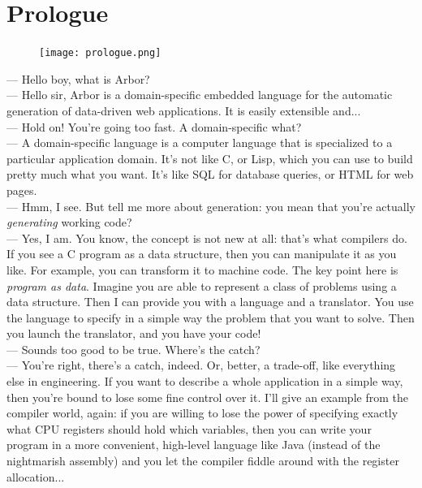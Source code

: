 \documentclass[12pt]{article} %
\newcommand{\ddwa}{data-driven web application}
\newcommand{\dsel}{domain-specific embedded language}
\newcommand{\dsl}{domain-specific language}
\newcommand{\A}{Arbor}
\begin{document}

\tableofcontents %

\newpage %

\section{Prologue}
\begin{figure}\texttt{[image: prologue.png]}\end{figure}
--- Hello boy, what is \A{}?\\
--- Hello sir, \A{} is a \dsel{} for the automatic generation of \ddwa{}s. It is easily extensible and...\\
--- Hold on! You're going too fast. A domain-specific what?\\
--- A \dsl{} is a computer language that is specialized to a particular application domain. It's not like C, or Lisp, which you can use to build pretty much what you want. It's like SQL for database queries, or HTML for web pages.\\
--- Hmm, I see. But tell me more about generation: you mean that you're actually \emph{generating} working code?\\
--- Yes, I am. You know, the concept is not new at all: that's what compilers do. If you see a C program as a data structure, then you can manipulate it as you like. For example, you can transform it to machine code. The key point here is \emph{program as data}. Imagine you are able to represent a class of problems using a data structure. Then I can provide you with a language and a translator. You use the language to specify in a simple way the problem that you want to solve. Then you launch the translator, and you have your code!\\
--- Sounds too good to be true. Where's the catch?\\
--- You're right, there's a catch, indeed. Or, better, a trade-off, like everything else in engineering. If you want to describe a whole application in a simple way, then you're bound to lose some fine control over it. I'll give an example from the compiler world, again: if you are willing to lose the power of specifying exactly what CPU registers should hold which variables, then you can write your program in a more convenient, high-level language like Java (instead of the nightmarish assembly) and you let the compiler fiddle around with the register allocation...\\
\end{document}
